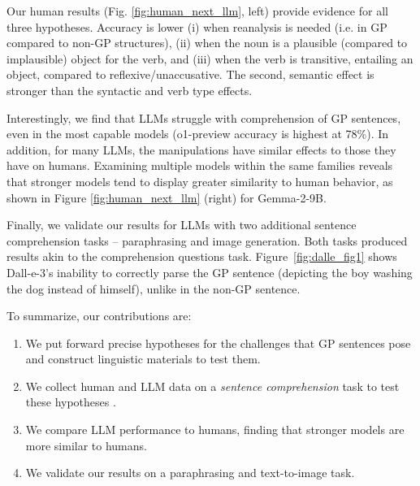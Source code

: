 Our human results (Fig. \ref{fig:human_next_llm}, left) provide evidence for all three hypotheses. Accuracy is lower (i) when reanalysis is needed (i.e. in GP compared to non-GP structures), (ii) when the noun is a plausible (compared to implausible) object for the verb, and (iii) when the verb is transitive, entailing an object, compared to reflexive/unaccusative.  The second, semantic effect is stronger than the syntactic and verb type effects. 

Interestingly, we find that LLMs struggle with comprehension of GP sentences, even in the most capable models (o1-preview accuracy is highest at 78\%). In addition, for many LLMs, the manipulations have similar effects to those they have on humans. Examining multiple models within the same families reveals that stronger models tend to display greater similarity to human behavior, as shown in Figure \ref{fig:human_next_llm} (right) for Gemma-2-9B.


Finally, we validate our results for LLMs with two additional sentence comprehension tasks -- paraphrasing and image generation. Both tasks produced results akin to the comprehension questions task. Figure~\ref{fig:dalle_fig1} shows Dall-e-3's \cite{dalle_3} inability to correctly parse the GP sentence (depicting the boy washing the dog instead of himself), unlike in the non-GP sentence.


To summarize, our contributions are:
\begin{enumerate}[nosep]
    \item We put forward precise hypotheses for the challenges that GP sentences pose and construct linguistic materials to test them.
    \item We collect human and LLM data on a \emph{sentence comprehension} task to test these hypotheses .
    \item We compare LLM performance to humans, finding that stronger models are more similar to humans. 
    \item We validate our results on a paraphrasing and text-to-image task.
\end{enumerate}
